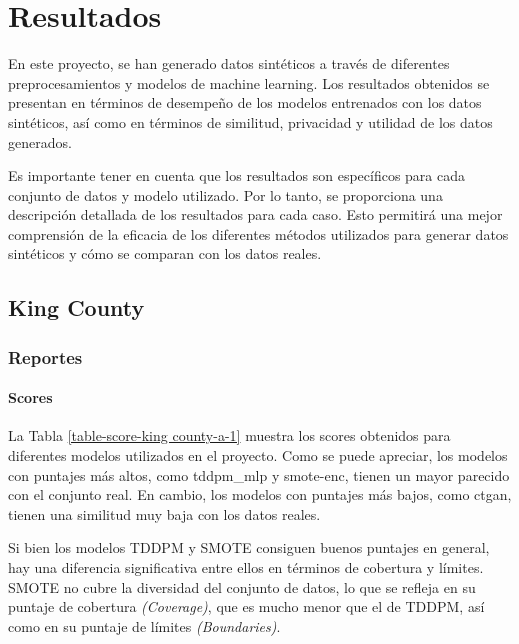 \chapter{Resultados}
En este proyecto, se han generado datos sintéticos a través de diferentes preprocesamientos y modelos de machine learning. Los resultados obtenidos se presentan en términos de desempeño de los modelos entrenados con los datos sintéticos, así como en términos de similitud, privacidad y utilidad de los datos generados.

Es importante tener en cuenta que los resultados son específicos para cada conjunto de datos y modelo utilizado. Por lo tanto, se proporciona una descripción detallada de los resultados para cada caso. Esto permitirá una mejor comprensión de la eficacia de los diferentes métodos utilizados para generar datos sintéticos y cómo se comparan con los datos reales.

\newpage
\section{King County}

\subsection{Reportes}

\subsubsection{Scores}

La Tabla \ref{table-score-king county-a-1} muestra los scores obtenidos para diferentes modelos utilizados en el proyecto. Como se puede apreciar, los modelos con puntajes más altos, como tddpm\_mlp y smote-enc, tienen un mayor parecido con el conjunto real. En cambio, los modelos con puntajes más bajos, como ctgan, tienen una similitud muy baja con los datos reales.



Si bien los modelos TDDPM y SMOTE consiguen buenos puntajes en general, hay una diferencia significativa entre ellos en términos de cobertura y límites. SMOTE no cubre la diversidad del conjunto de datos, lo que se refleja en su puntaje de cobertura \emph{(Coverage)}, que es mucho menor que el de TDDPM, así como en su puntaje de límites \emph{(Boundaries)}.
\newpage

